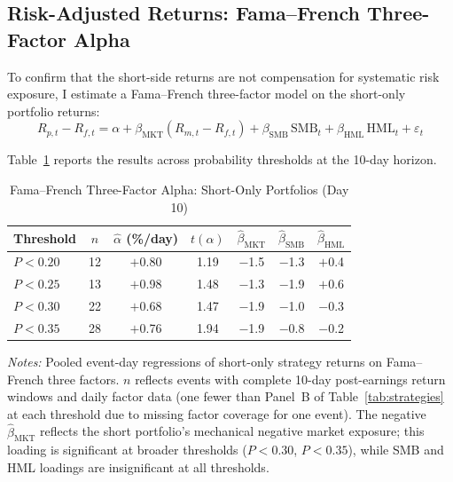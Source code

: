\documentclass[11pt]{article}
\begin{document}
\subsection{Risk-Adjusted Returns: Fama--French Three-Factor Alpha}

To confirm that the short-side returns are not compensation for systematic risk exposure, I estimate a Fama--French three-factor model \citep{fama1993common} on the short-only portfolio returns:
\begin{equation}
R_{p,t} - R_{f,t} = \alpha + \beta_{\text{MKT}} (R_{m,t} - R_{f,t}) + \beta_{\text{SMB}} \, \text{SMB}_t + \beta_{\text{HML}} \, \text{HML}_t + \varepsilon_t
\end{equation}

Table~\ref{tab:ff3} reports the results across probability thresholds at the 10-day horizon.

\begin{table}[htbp]
\centering
\begin{threeparttable}
\caption{Fama--French Three-Factor Alpha: Short-Only Portfolios (Day 10)}
\label{tab:ff3}
\begin{tabular}{lcccccc}
\toprule
Threshold & $n$ & $\hat{\alpha}$ (\%/day) & $t(\alpha)$ & $\hat{\beta}_{\text{MKT}}$ & $\hat{\beta}_{\text{SMB}}$ & $\hat{\beta}_{\text{HML}}$ \\
\midrule
$P < 0.20$ & 12 & $+$0.80 & 1.19 & $-$1.5 & $-$1.3 & $+$0.4 \\
$P < 0.25$ & 13 & $+$0.98 & 1.48 & $-$1.3 & $-$1.9 & $+$0.6 \\
$P < 0.30$ & 22 & $+$0.68 & 1.47 & $-$1.9 & $-$1.0 & $-$0.3 \\
$P < 0.35$ & 28 & $+$0.76 & 1.94 & $-$1.9 & $-$0.8 & $-$0.2 \\
\bottomrule
\end{tabular}
\begin{tablenotes}
\small
\item \textit{Notes:} Pooled event-day regressions of short-only strategy returns on Fama--French three factors. $n$ reflects events with complete 10-day post-earnings return windows and daily factor data (one fewer than Panel~B of Table~\ref{tab:strategies} at each threshold due to missing factor coverage for one event). The negative $\hat{\beta}_{\text{MKT}}$ reflects the short portfolio's mechanical negative market exposure; this loading is significant at broader thresholds ($P < 0.30$, $P < 0.35$), while SMB and HML loadings are insignificant at all thresholds.
\end{tablenotes}
\end{threeparttable}
\end{table}
\end{document}
